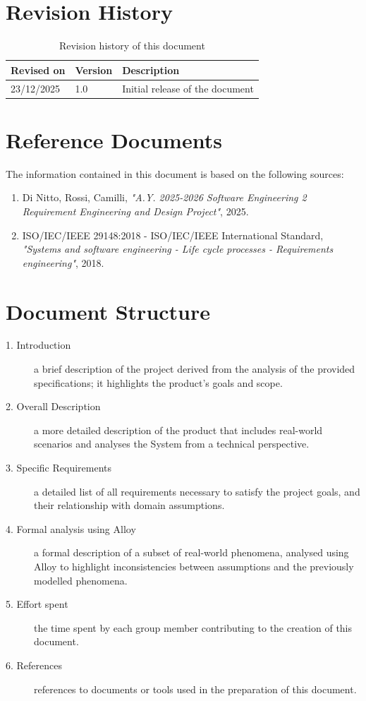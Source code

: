\section{Revision History}
\begin{table}[H]
    \sf
    \small
    \centering
    \renewcommand{\arraystretch}{1.5}
    \begin{tabularx}{\textwidth}{|l|l|X|}
        \hline
        \rowcolor{lightgray} \textbf{Revised on} & \textbf{Version} & \textbf{Description}\\
        \hline
        23/12/2025 & 1.0 & Initial release of the document \\
        \hline
    \end{tabularx}
    \caption{Revision history of this document}
\end{table}

\section{Reference Documents}
The information contained in this document is based on the following sources:
\begin{enumerate}[noitemsep]
    \item Di Nitto, Rossi, Camilli, \emph{"A.Y. 2025-2026 Software Engineering 2 Requirement Engineering and Design Project"}, 2025.
    \item ISO/IEC/IEEE 29148:2018 - ISO/IEC/IEEE International Standard, \emph{"Systems and software engineering - Life cycle processes - Requirements engineering"}, 2018.
\end{enumerate}

\section{Document Structure}
\begin{description}
    \item [1. Introduction] a brief description of the project derived from the analysis of the provided specifications; it highlights the product's goals and scope.
    \item [2. Overall Description] a more detailed description of the product that includes real-world scenarios and analyses the System from a technical perspective.
    \item [3. Specific Requirements] a detailed list of all requirements necessary to satisfy the project goals, and their relationship with domain assumptions.
    \item [4. Formal analysis using Alloy] a formal description of a subset of real-world phenomena, analysed using Alloy to highlight inconsistencies between assumptions and the previously modelled phenomena.
    \item [5. Effort spent] the time spent by each group member contributing to the creation of this document.
    \item [6. References] references to documents or tools used in the preparation of this document.
\end{description}